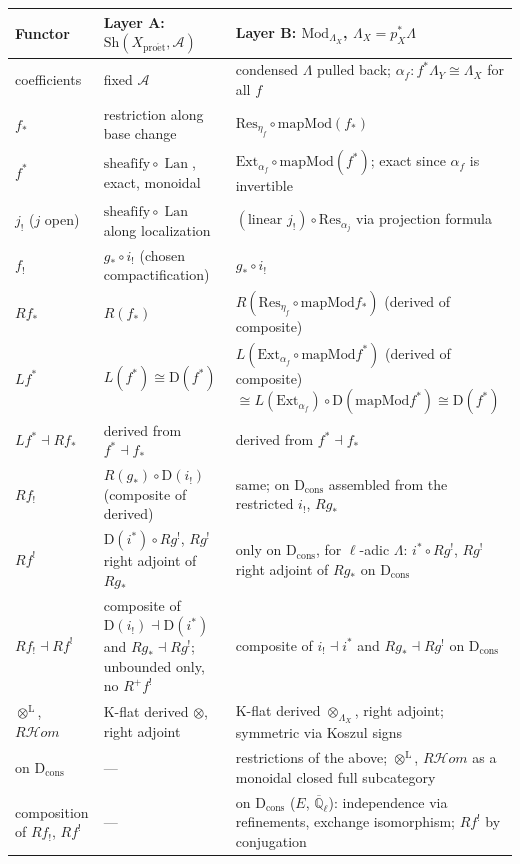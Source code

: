 \documentclass[11pt]{article}
\theoremstyle{remark}
\newcommand{\proet}{\mathrm{pro\acute{e}t}}
\newcommand{\Sh}{\mathrm{Sh}}
\newcommand{\Mod}{\mathrm{Mod}}
\newcommand{\RHom}{R\mathcal{H}om}
\newcommand{\D}{\mathrm{D}}
\newcommand{\Res}{\mathrm{Res}}
\newcommand{\Ext}{\mathrm{Ext}}
\newcommand{\Qlbar}{\overline{\mathbb{Q}}_\ell}
\newcommand{\lotimes}{\otimes^{\mathrm{L}}}
\newcommand{\Dc}{\D_{\mathrm{cons}}}
\begin{document}
\medskip
\noindent
\begin{tabularx}{\textwidth}{@{}lXX@{}}
\toprule
Functor & Layer A: $\Sh(X_\proet,\mathcal{A})$ & Layer B: $\Mod_{\Lambda_X}$,
  $\Lambda_X=p_X^*\Lambda$\\
\midrule
coefficients & fixed $\mathcal{A}$ & condensed $\Lambda$ pulled back; $\alpha_f\colon
  f^*\Lambda_Y\cong\Lambda_X$ for all $f$\\
$f_*$ & restriction along base change &
  $\Res_{\eta_f}\circ\mathrm{mapMod}(f_*)$\\
$f^*$ & $\mathrm{sheafify}\circ\operatorname{Lan}$, exact, monoidal &
  $\Ext_{\alpha_f}\circ\mathrm{mapMod}(f^*)$; exact since $\alpha_f$ is invertible\\
$j_!$ ($j$ open) & $\mathrm{sheafify}\circ\operatorname{Lan}$ along localization &
  $(\text{linear }j_!)\circ\Res_{\alpha_j}$ via projection formula\\
$f_!$ & $g_*\circ i_!$ (chosen compactification) & $g_*\circ i_!$\\
$Rf_*$ & $R(f_*)$ &
  $R(\Res_{\eta_f}\circ\mathrm{mapMod}f_*)$ (derived of composite)\\
$Lf^*$ & $L(f^*)\cong\D(f^*)$ &
  $L(\Ext_{\alpha_f}\circ\mathrm{mapMod}f^*)$ (derived of composite)
  $\cong L(\Ext_{\alpha_f})\circ\D(\mathrm{mapMod}f^*)\cong\D(f^*)$\\
$Lf^*\dashv Rf_*$ & derived from $f^*\dashv f_*$ & derived from $f^*\dashv f_*$\\
$Rf_!$ & $R(g_*)\circ\D(i_!)$ (composite of derived) & same; on $\Dc$ assembled from the
  restricted $i_!$, $Rg_*$\\
$Rf^!$ & $\D(i^*)\circ Rg^!$, $Rg^!$ right adjoint of $Rg_*$ & only on $\Dc$, for $\ell$-adic
  $\Lambda$: $i^*\circ Rg^!$, $Rg^!$ right adjoint of $Rg_*$ on $\Dc$\\
$Rf_!\dashv Rf^!$ & composite of $\D(i_!)\dashv\D(i^*)$ and $Rg_*\dashv Rg^!$; unbounded
  only, no $R^+f^!$ & composite of $i_!\dashv i^*$ and $Rg_*\dashv Rg^!$ on $\Dc$\\
$\lotimes$, $\RHom$ & K-flat derived $\otimes$, right adjoint &
  K-flat derived $\otimes_{\Lambda_X}$, right adjoint; symmetric via Koszul signs\\
on $\Dc$ & --- & restrictions of the above; $\lotimes$, $\RHom$ as a monoidal closed full
  subcategory\\
composition of $Rf_!$, $Rf^!$ & --- & on $\Dc$ ($E$, $\Qlbar$): independence via refinements,
  exchange isomorphism; $Rf^!$ by conjugation\\

\end{tabularx}
\end{document}
